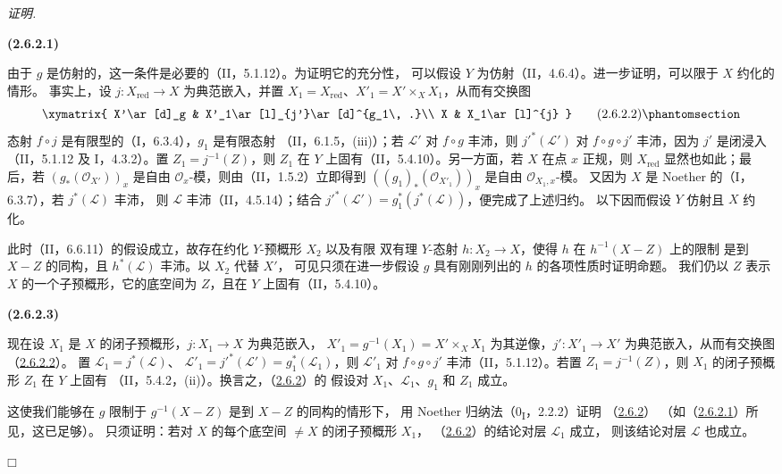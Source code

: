\documentclass[UTF8,fontset=none,11pt,oneside,openany]{ctexbook}
\providecommand{\square}{\mdlgwhtsquare}
\newenvironment{env}[1][]{%
  \par\medskip\noindent\textbf{(#1)}\ %
}{\par}
\newenvironment{proof}{%
  \par\smallskip\noindent\textit{证明.}\ %
}{\hfill$\square$\par}
\newcommand{\oldpage}[2][]{%
  \hypertarget{ega-source-page-#1-#2}{}%
  \marginnote{\scriptsize\textbf{#1}~|~#2}\ignorespaces}
\let\EGAOriginalLabel\label
\renewcommand{\label}[1]{\phantomsection\EGAOriginalLabel{#1}}
\begin{document}
\begin{proof}
\begin{env}[2.6.2.1]
\label{III.2.6.2.1-fr}
由于 $g$ 是仿射的，这一条件是必要的（II，5.1.12）。为证明它的充分性，
可以假设 $Y$ 为仿射（II，4.6.4）。进一步证明，可以限于 $X$ 约化的情形。
事实上，设 $j:X_{\mathrm{red}}\to X$ 为典范嵌入，并置
$X_1=X_{\mathrm{red}}$、$X'_1=X'\times_X X_1$，从而有交换图
\[
\xymatrix{
X'\ar[d]_g & X'_1\ar[l]_{j'}\ar[d]^{g_1\, .}\\
X & X_1\ar[l]^{j}
}
\tag{2.6.2.2}\label{III.2.6.2.2-fr}
\]
态射 $f\circ j$ 是有限型的（I，6.3.4），$g_1$ 是有限态射
（II，6.1.5，(iii)）；若 $\mathcal L'$ 对 $f\circ g$ 丰沛，则
$j'^*(\mathcal L')$ 对 $f\circ g\circ j'$ 丰沛，因为 $j'$ 是闭浸入
（II，5.1.12 及 I，4.3.2）。置 $Z_1=j^{-1}(Z)$，则 $Z_1$ 在 $Y$
上固有（II，5.4.10）。另一方面，若 $X$ 在点 $x$ 正规，则
$X_{\mathrm{red}}$ 显然也如此；最后，若 $(g_*(\mathcal O_{X'}))_x$
是自由 $\mathcal O_x$-模，则由（II，1.5.2）立即得到
$((g_1)_*(\mathcal O_{X'_1}))_x$ 是自由 $\mathcal O_{X_1,x}$-模。
又因为 $X$ 是 Noether 的（I，6.3.7），若 $j^*(\mathcal L)$ 丰沛，
则 $\mathcal L$ 丰沛（II，4.5.14）；结合
$j'^*(\mathcal L')=g_1^*(j^*(\mathcal L))$，便完成了上述归约。
以下因而假设 $Y$ 仿射且 $X$ 约化。
\end{env}

此时（II，6.6.11）的假设成立，故存在约化 $Y$-预概形 $X_2$ 以及有限
双有理 $Y$-态射 $h:X_2\to X$，使得 $h$ 在 $h^{-1}(X-Z)$ 上的限制
是到 $X-Z$ 的同构，且 $h^*(\mathcal L)$ 丰沛。以 $X_2$ 代替 $X'$，
可见只须在进一步假设 $g$ 具有刚刚列出的 $h$ 的各项性质时证明命题。
我们仍以 $Z$ 表示 $X$ 的一个子预概形，它的底空间为 $Z$，且在 $Y$
上固有（II，5.4.10）。

\begin{env}[2.6.2.3]
\label{III.2.6.2.3-fr}
现在设 $X_1$ 是 $X$ 的闭子预概形，$j:X_1\to X$ 为典范嵌入，
$X'_1=g^{-1}(X_1)=X'\times_X X_1$ 为其逆像，$j':X'_1\to X'$
为典范嵌入，从而有交换图（\hyperref[III.2.6.2.2-fr]{2.6.2.2}）。
置 $\mathcal L_1=j^*(\mathcal L)$、
$\mathcal L'_1=j'^*(\mathcal L')=g_1^*(\mathcal L_1)$，则
$\mathcal L'_1$ 对 $f\circ g\circ j'$ 丰沛（II，5.1.12）。若置
$Z_1=j^{-1}(Z)$，则 $X_1$ 的闭子预概形 $Z_1$ 在 $Y$ 上固有
（II，5.4.2，(ii)）。换言之，（\hyperref[III.2.6.2-fr]{2.6.2}）的
假设对 $X_1$、$\mathcal L_1$、$g_1$ 和 $Z_1$ 成立。
\end{env}

\oldpage[III]{113}
这使我们能够在 $g$ 限制于 $g^{-1}(X-Z)$ 是到 $X-Z$ 的同构的情形下，
用 Noether 归纳法（0\textsubscript{I}，2.2.2）证明
（\hyperref[III.2.6.2-fr]{2.6.2}）
（如（\hyperref[III.2.6.2.1-fr]{2.6.2.1}）所见，这已足够）。
只须证明：若对 $X$ 的每个底空间 $\neq X$ 的闭子预概形 $X_1$，
（\hyperref[III.2.6.2-fr]{2.6.2}）的结论对层 $\mathcal L_1$ 成立，
则该结论对层 $\mathcal L$ 也成立。


\end{proof}
\end{document}
